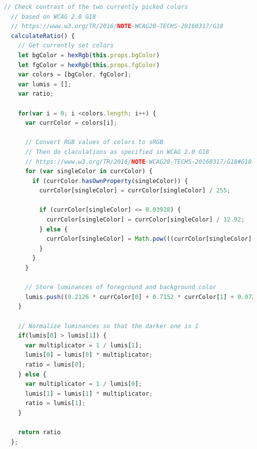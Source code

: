 \begin{lstlisting}[caption={Berechnung des Kontrastverhältnisses zweier Farben nach WCAG 2.0 in JavaScript}, label={lst:contrast-code}, language=javascript]
  // Check contrast of the two currently picked colors
  // based on WCAG 2.0 G18
  // https://www.w3.org/TR/2016/NOTE-WCAG20-TECHS-20160317/G18
  calculateRatio() {
    // Get currently set colors
    let bgColor = hexRgb(this.props.bgColor)
    let fgColor = hexRgb(this.props.fgColor)
    var colors = [bgColor, fgColor];
    var lumis = [];
    var ratio;

    for(var i = 0; i <colors.length; i++) {
      var currColor = colors[i];

      // Convert RGB values of colors to sRGB
      // Then do claculations as specified in WCAG 2.0 G18
      // https://www.w3.org/TR/2016/NOTE-WCAG20-TECHS-20160317/G18#G18-tests
      for (var singleColor in currColor) {
        if (currColor.hasOwnProperty(singleColor)) {
          currColor[singleColor] = currColor[singleColor] / 255;

          if (currColor[singleColor] <= 0.03928) {
            currColor[singleColor] = currColor[singleColor] / 12.92;
          } else {
            currColor[singleColor] = Math.pow(((currColor[singleColor] + 0.055) / 1.055), 2.4);
          }
        }
      }

      // Store luminances of foreground and background color
      lumis.push((0.2126 * currColor[0] + 0.7152 * currColor[1] + 0.0722 * currColor[2]) + 0.05);
    }

    // Normalize luminances so that the darker one is 1
    if(lumis[0] > lumis[1]) {
      var multiplicator = 1 / lumis[1];
      lumis[0] = lumis[0] * multiplicator;
      ratio = lumis[0];
    } else {
      var multiplicator = 1 / lumis[0];
      lumis[1] = lumis[1] * multiplicator;
      ratio = lumis[1];
    }

    return ratio
  };
\end{lstlisting}


\clearpage
